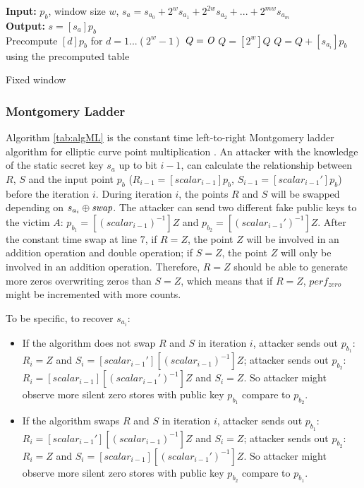 \documentclass{iacrtrans}
\begin{document}
\begin{algorithm}[H]
\SetAlgoLined
\textbf{Input: } $p_b$, window size $w$, $s_a = s_{a_0} + 2^ws_{a_1} + 2^{2w}s_{a_2} + ... + 2^{mw}s_{a_m}$ \\
\textbf{Output: } $s = [s_a]p_b$ \\
 Precompute $[d]p_b$ for $d = 1...(2^w-1)$\;
 $Q = \emph{O}$\;
  {
     $Q = [2^w]Q$\;
     $Q = Q + [s_{a_i}]p_b$ using the precomputed table\;
  }
 \caption{Fixed window}
 \label{tab:algFW}
\end{algorithm}

\subsubsection{Montgomery Ladder}
Algorithm \ref{tab:algML} is the constant time left-to-right Montgomery ladder algorithm for elliptic curve point multiplication \cite{montgomery1987speeding}. An attacker with the knowledge of the static secret key $s_a$ up to bit $i-1$, can calculate the relationship between $R$, $S$ and the input point $p_b$ ($R_{i-1}=[scalar_{i-1}]p_b$, $S_{i-1}=[scalar_{i-1}']p_b$) before the iteration $i$. During iteration $i$, the points $R$ and $S$ will be swapped depending on $s_{a_i} \oplus \emph{swap}$. The attacker can send two different fake public keys to the victim $A$: $p_{b_1} = [(scalar_{i-1})^{-1}]Z$ and $p_{b_2}=[(scalar_{i-1}')^{-1}]Z$. After the constant time swap at line 7, if $R=Z$, the point $Z$ will be involved in an addition operation and double operation; if $S=Z$, the point $Z$ will only be involved in an addition operation. Therefore, $R=Z$ should be able to generate more zeros overwriting zeros than $S=Z$, which means that if $R=Z$, $perf_{zero}$ might be incremented with more counts.

To be specific, to recover $s_{a_i}$: 
\begin{itemize}
    \item If the algorithm does not swap $R$ and $S$ in iteration $i$, attacker sends out $p_{b_1}$: $R_i = Z$ and $S_i = [scalar_{i-1}'][(scalar_{i-1})^{-1}]Z$; attacker sends out $p_{b_2}$: $R_i = [scalar_{i-1}][(scalar_{i-1}')^{-1}]Z$ and $S_i = Z$. So attacker might observe more silent zero stores with public key $p_{b_1}$ compare to $p_{b_2}$.
    \item If the algorithm swaps $R$ and $S$ in iteration $i$, attacker sends out $p_{b_1}$: $R_i = [scalar_{i-1}'][(scalar_{i-1})^{-1}]Z$ and $S_i = Z$; attacker sends out $p_{b_2}$: $R_i = Z$ and $S_i = [scalar_{i-1}][(scalar_{i-1}')^{-1}]Z$. So attacker might observe more silent zero stores with public key $p_{b_2}$ compare to $p_{b_1}$.
\end{itemize}
\end{document}
